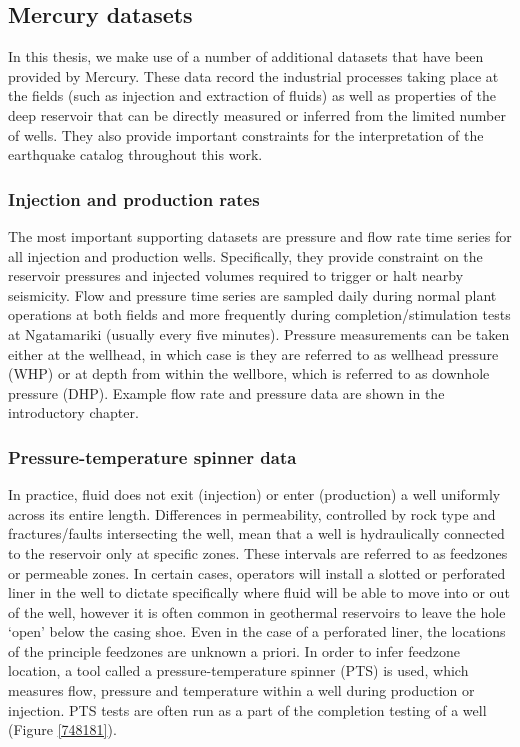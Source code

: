\subsection{Mercury datasets}
In this thesis, we make use of a number of additional datasets that have been provided by Mercury. These data record the industrial processes taking place at the fields (such as injection and extraction of fluids) as well as properties of the deep reservoir that can be directly measured or inferred from the limited number of wells. They also provide important constraints for the interpretation of the earthquake catalog throughout this work.

\subsubsection{Injection and production rates}
The most important supporting datasets are pressure and flow rate time series for all injection and production wells. Specifically, they provide constraint on the reservoir pressures and injected volumes required to trigger or halt nearby seismicity. Flow and pressure time series are sampled daily during normal plant operations at both fields and more frequently during completion\slash{stimulation} tests at Ngatamariki (usually every five minutes). Pressure measurements can be taken either at the wellhead, in which case is they are referred to as wellhead pressure (WHP) or at depth from within the wellbore, which is referred to as downhole pressure (DHP). Example flow rate and pressure data are shown in the introductory chapter.

\subsubsection{Pressure-temperature spinner data}
In practice, fluid does not exit (injection) or enter (production) a well uniformly across its entire length. Differences in permeability, controlled by rock type and fractures\slash{faults} intersecting the well, mean that a well is hydraulically connected to the reservoir only at specific zones. These intervals are referred to as feedzones or permeable zones. In certain cases, operators will install a slotted or perforated liner in the well to dictate specifically where fluid will be able to move into or out of the well, however it is often common in geothermal reservoirs to leave the hole `open' below the casing shoe. Even in the case of a perforated liner, the locations of the principle feedzones are unknown a priori. In order to infer feedzone location, a tool called a pressure-temperature spinner (PTS) is used, which measures flow, pressure and temperature within a well during production or injection. PTS tests are often run as a part of the completion testing of a well (Figure \ref{748181}).

